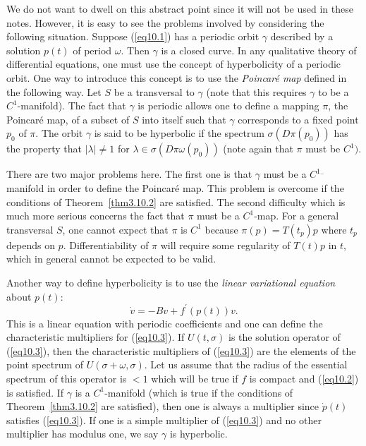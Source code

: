 \documentclass{surv-l}
\theoremstyle{plain}
\theoremstyle{definition}
\numberwithin{equation}{section}
\numberwithin{figure}{chapter}
\begin{document}
We do not want to dwell on this abstract point since it will not be used in these notes. However, it is easy to see the problems involved by considering the following situation. Suppose (\ref{eq10.1}) has a periodic orbit $\gamma$ described by a solution $p(t)$ of period $\omega$. Then $\gamma$ is a closed curve. In any qualitative theory of differential equations, one must use the concept of hyperbolicity of a periodic orbit. One way to introduce this concept is to use the \emph{Poincar\'{e} map} defined in the following way. Let $S$ be a transversal to $\gamma$ (note that this requires $\gamma$ to be a $C^{1}$-manifold). The fact that $\gamma$ is periodic allows one to define a mapping $\pi$, the Poincar\'{e} map, of a subset of $S$ into itself such that $\gamma$ corresponds to a fixed point $p_{0}$ of $\pi$. The orbit $\gamma$ is said to be hyperbolic if the spectrum $\sigma(D\pi(p_{0}))$ has the property that $|\lambda|\neq 1$ for $\lambda\in\sigma(D\pi\omega(p_{0}))$ (note again that $\pi$ must be $C^{1})$.

There are two major problems here. The first one is that $\gamma$ must be a $C^{1_{-}}$ manifold in order to define the Poincar\'{e} map. This problem is overcome if the conditions of Theorem~\ref{thm3.10.2} are satisfied. The second difficulty which is much more serious concerns the fact that $\pi$ must be a $C^{1}$-map. For a general transversal $S$, one cannot expect that $\pi$ is $C^{1}$ because $\pi(p)=T(t_{p})p$ where $t_{p}$ depends on $p$. Differentiability of $\pi$ will require some regularity of $T(t)p$ in $t$, which in general cannot be expected to be valid.

Another way to define hyperbolicity is to use the \emph{linear variational equation} about $p(t)$:
\begin{equation}\label{eq10.3}
\dot{v}=-Bv+f^{\prime}(p(t))v.
\end{equation}
This is a linear equation with periodic coefficients and one can define the characteristic multipliers for (\ref{eq10.3}). If $U(t, \sigma)$ is the solution operator of (\ref{eq10.3}), then the characteristic multipliers of (\ref{eq10.3}) are the elements of the point spectrum of $U(\sigma+\omega, \sigma)$. Let us assume that the radius of the essential spectrum of this operator is $<1$ which will be true if $f$ is compact and (\ref{eq10.2}) is satisfied. If $\gamma$ is a $C^{1}$-manifold (which is true if the conditions of Theorem~\ref{thm3.10.2} are satisfied), then one is always a multiplier since $\dot{p}(t)$ satisfies (\ref{eq10.3}). If one is a simple multiplier of (\ref{eq10.3}) and no other multiplier has modulus one, we say $\gamma$ is hyperbolic.
\end{document}
